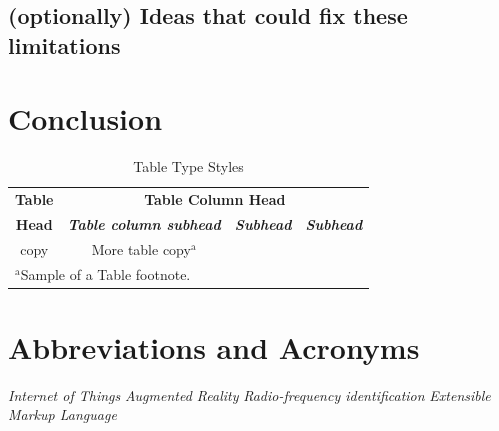 \documentclass[conference]{IEEEtran}
\begin{document}
\subsection{(optionally) Ideas that could fix these limitations}

\section{Conclusion}\label{Conclusion}


\begin{table}[htbp]
\caption{Table Type Styles}
\begin{center}
\begin{tabular}{|c|c|c|c|}
\hline
\textbf{Table}&\multicolumn{3}{|c|}{\textbf{Table Column Head}} \\
\cline{2-4} 
\textbf{Head} & \textbf{\textit{Table column subhead}}& \textbf{\textit{Subhead}}& \textbf{\textit{Subhead}} \\
\hline
copy& More table copy$^{\mathrm{a}}$& &  \\
\hline
\multicolumn{4}{l}{$^{\mathrm{a}}$Sample of a Table footnote.}
\end{tabular}
\label{tab1}
\end{center}
\end{table}

\section*{Abbreviations and Acronyms}
\begin{acronym}[Bash]
 {\textit{Internet of Things}}
 {\textit{Augmented Reality}}
 {\textit{Radio-frequency identification}}
 {\textit{Extensible Markup Language}}
\end{acronym}


{\footnotesize
}
\end{document}
